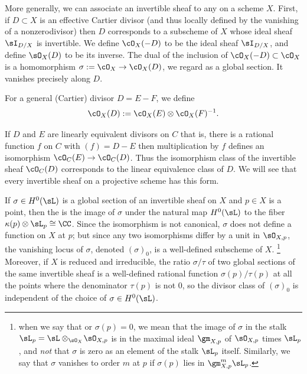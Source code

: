 More generally, we can associate an invertible sheaf to any 
%
on a scheme $X$.
First, if
 $D\subset X$ is an effective Cartier divisor (and thus locally defined by the vanishing of a nonzerodivisor) then
$D$ corresponds to a subscheme of $X$ whose ideal sheaf $\sI_{D/X}$
is invertible. We define $\cO_X(-D)$ to be the ideal sheaf $\sI_{D/X}$, and define $\sO_{X}(D)$ to be 
its inverse. The dual of the inclusion of
$\cO_X(-D) \subset \cO_X$ is a homomorphism $\sigma := \cO_X \to
\cO_X(D)$, 
we regard as a global section. It
vanishes precisely along $D$. 

For a general (Cartier) divisor $D = E - F$, we define
$$
\cO_X(D) := \cO_X(E) \otimes \cO_X(F)^{-1}.
$$

If $D$ and $E$ are linearly equivalent divisors on $C$ \emdash that is, 
there is a rational function $f$ on $C$ with $(f) = D - E$ \emdash
then multiplication by $f$ defines an isomorphism 
$\cO_C(E) \to \cO_C(D)$. 
Thus the isomorphism class of the invertible sheaf $\cO_C(D)$
corresponds to the linear equivalence class of $D$. We will see 
that every invertible sheaf on a projective scheme has this form.

If $\sigma\in H^0(\sL)$ is a global section of an invertible sheaf on
%
$X$ and $p\in X$ is a point, then the 
is the image  of $\sigma$ under the natural map
$H^0(\sL)$ to the fiber $\kappa(p) \otimes \sL_{p} \cong \CC$. 
Since the isomorphism is not canonical, $\sigma$ does not define a function on $X$ at $p$; but since any two isomorphisms
differ by a unit in $\sO_{X,p}$, the vanishing locus of $\sigma$,
denoted $(\sigma)_0$, is a well-defined subscheme of $X$.%
%
\footnote{
when we  say that 
\def\marginpar{\marginparhere[200pt]}%
or $\sigma(p) = 0$, we mean that the 
image of $\sigma$ in the stalk $\sL_p = \sL \otimes_{\sO_{X}}\!\sO_{X,p}$ is in
the maximal ideal $\gm_{X,p}$ of $\sO_{X,p}$ times $\sL_p$,
and \emph{not} that $\sigma$ is zero
as an element of the stalk $\sL_p$ itself. Similarly, we say that $\sigma$ vanishes to order $m$ at $p$ if $\sigma(p)$ lies in $\gm_{X,p}^m\sL_p$. }
%
 Moreover, if $X$ is reduced and irreducible, 
the ratio $\sigma/\tau$ of two global sections
 of the same invertible sheaf is a well-defined rational function
$\sigma(p)/\tau(p)$ at all the points where the denominator $\tau(p)$ is not 0, so the divisor class of 
$(\sigma)_0$ is independent of the choice of $\sigma \in H^0(\sL)$.

